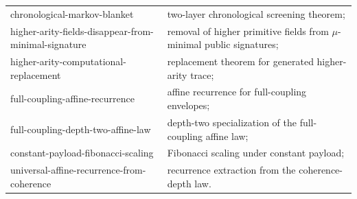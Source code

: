 \documentclass[11pt]{article}
\theoremstyle{plain}
\theoremstyle{definition}
\theoremstyle{remark}
\newcommand{\mname}[1]{\begingroup\ttfamily\footnotesize #1\endgroup}
\begin{document}
\begin{longtable}{@{}>{\raggedright\arraybackslash}p{}>{\raggedright\arraybackslash}p{}@{}}
\mname{chronological-\allowbreak{}markov-\allowbreak{}blanket}
& two-layer chronological screening theorem; \\
\mname{higher-\allowbreak{}arity-\allowbreak{}fields-\allowbreak{}disappear-\allowbreak{}from-\allowbreak{}minimal-\allowbreak{}signature}
& removal of higher primitive fields from \(\mu\)-minimal public signatures; \\
\mname{higher-\allowbreak{}arity-\allowbreak{}computational-\allowbreak{}replacement}
& replacement theorem for generated higher-arity trace; \\
\mname{full-\allowbreak{}coupling-\allowbreak{}affine-\allowbreak{}recurrence}
& affine recurrence for full-coupling envelopes; \\
\mname{full-\allowbreak{}coupling-\allowbreak{}depth-\allowbreak{}two-\allowbreak{}affine-\allowbreak{}law}
& depth-two specialization of the full-coupling affine law; \\
\mname{constant-\allowbreak{}payload-\allowbreak{}fibonacci-\allowbreak{}scaling}
& Fibonacci scaling under constant payload; \\
\mname{universal-\allowbreak{}affine-\allowbreak{}recurrence-\allowbreak{}from-\allowbreak{}coherence}
& recurrence extraction from the coherence-depth law. \\
\bottomrule
\end{longtable}
\end{document}
